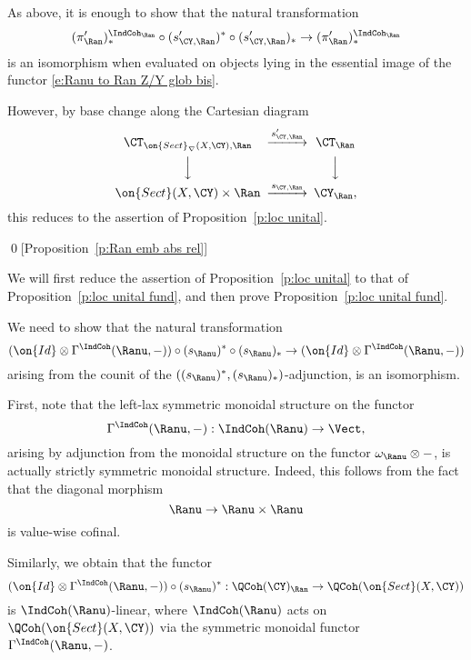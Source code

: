 \documentclass[9pt]{amsart}
\theoremstyle{remark}
\theoremstyle{definition}
\theoremstyle{remark}
\newcommand{\propref}[1]{Proposition~\ref{#1}}
\numberwithin{equation}{section}
\begin{document}

As above, it is enough to show that the natural transformation
\begin{equation} \label{e:factor nat transf 2 red}
(\pi'_\Ran)^{\IndCoh_\Ran}_*\circ (s'_{\CY,\Ran})^*\circ (s'_{\CY,\Ran})_*\to (\pi'_\Ran)^{\IndCoh_\Ran}_*
\end{equation}
is an isomorphism when evaluated on objects lying in the essential image of the functor \eqref{e:Ranu to Ran Z/Y glob bis}. 

\medskip

However, by base change along the Cartesian diagram
$$
\CD
\CT_{\on{Sect}_\nabla(X,\CY),\Ran} @>{s'_{\CY,\Ran}}>>  \CT_\Ran \\
@VVV @VVV \\
\on{Sect}(X,\CY) \times \Ran @>{s_{\CY,\Ran}}>> \CY_\Ran, 
\endCD
$$
this reduces to the assertion of \propref{p:loc unital}. 

\qed[\propref{p:Ran emb abs rel}]

\ssec{Proof of \propref{p:loc unital}} \label{ss:proof loc unital}

\sssec{}

We will first reduce the assertion of \propref{p:loc unital} to that of \propref{p:loc unital fund}, and then prove \propref{p:loc unital fund}.

\medskip

We need to show that the natural transformation
$$(\on{Id}\otimes \Gamma^{\IndCoh}(\Ranu,-))\circ (s_\Ranu)^*\circ (s_\Ranu)_*\to (\on{Id}\otimes \Gamma^{\IndCoh}(\Ranu,-))$$
arising from the counit of the $((s_\Ranu)^*,(s_\Ranu)_*)$-adjunction, is an isomorphism. 

\sssec{}

First, note that the left-lax symmetric monoidal structure on the functor 
$$\Gamma^{\IndCoh}(\Ranu,-):\IndCoh(\Ranu)\to \Vect,$$
arising by adjunction from the monoidal structure on the functor $\omega_{\Ranu}\otimes -$, is actually 
strictly symmetric monoidal structure. Indeed, this follows from the fact that the diagonal morphism
$$\Ranu\to \Ranu\times \Ranu$$
is value-wise cofinal. 

\sssec{}

Similarly, we obtain that the functor
$$(\on{Id}\otimes \Gamma^{\IndCoh}(\Ranu,-))\circ (s_\Ranu)^*: \QCoh(\CY)_\Ran\to \QCoh(\on{Sect}(X,\CY))$$
is $\IndCoh(\Ranu)$-linear, where $\IndCoh(\Ranu)$ acts on $\QCoh(\on{Sect}(X,\CY))$ via the 
symmetric monoidal functor $\Gamma^{\IndCoh}(\Ranu,-)$. 
\end{document}
